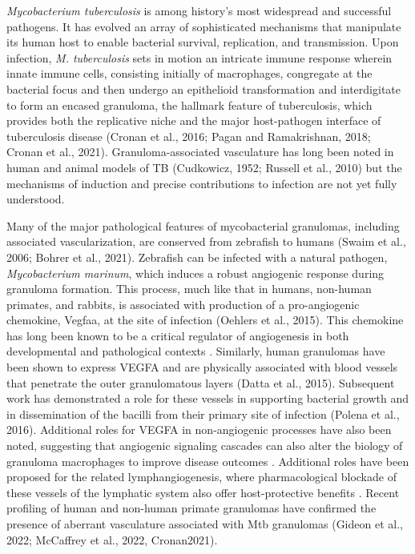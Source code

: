 \textit{Mycobacterium tuberculosis} is among history's most widespread and successful pathogens. It has evolved an array of sophisticated mechanisms that manipulate its human host to enable bacterial survival, replication, and transmission. Upon infection, \textit{M. tuberculosis} sets in motion an intricate immune response wherein innate immune cells, consisting initially of macrophages, congregate at the bacterial focus and then undergo an epithelioid transformation and interdigitate to form an encased granuloma, the hallmark feature of tuberculosis, which provides both the replicative niche and the major host-pathogen interface of tuberculosis disease (Cronan et al., 2016; Pagan and Ramakrishnan, 2018; Cronan et al., 2021). Granuloma-associated vasculature has long been noted in human and animal models of TB (Cudkowicz, 1952; Russell et al., 2010) but the mechanisms of induction and precise contributions to infection are not yet fully understood.

Many of the major pathological features of mycobacterial granulomas, including associated vascularization, are conserved from zebrafish to humans (Swaim et al., 2006; Bohrer et al., 2021). Zebrafish can be infected with a natural pathogen, \textit{Mycobacterium marinum}, which induces a robust angiogenic response during granuloma formation. This process, much like that in humans, non-human primates, and rabbits, is associated with production of a pro-angiogenic chemokine, Vegfaa, at the site of infection (Oehlers et al., 2015). This chemokine has long been known to be a critical regulator of angiogenesis in both developmental and pathological contexts \citep{}. Similarly, human granulomas have been shown to express VEGFA and are physically associated with blood vessels that penetrate the outer granulomatous layers (Datta et al., 2015). Subsequent work has demonstrated a role for these vessels in supporting bacterial growth and in dissemination of the bacilli from their primary site of infection (Polena et al., 2016). Additional roles for VEGFA in non-angiogenic processes have also been noted, suggesting that angiogenic signaling cascades can also alter the biology of granuloma macrophages to improve disease outcomes \citep{Harding2019}. Additional roles have been proposed for the related lymphangiogenesis, where pharmacological blockade of these vessels of the lymphatic system also offer host-protective benefits \citep{Harding2015}. Recent profiling of human and non-human primate granulomas have confirmed the presence of aberrant vasculature associated with Mtb granulomas (Gideon et al., 2022; McCaffrey et al., 2022, Cronan2021).


